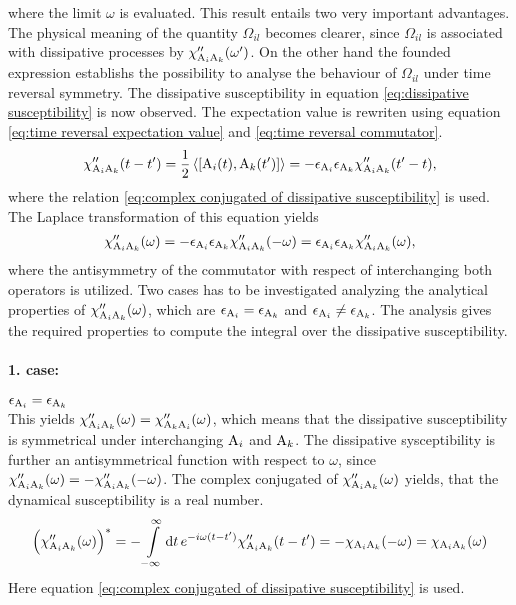 %
where the limit $\omega$ is evaluated.
This result entails two very important advantages.
The physical meaning of the quantity $\Omega_{il}$ becomes clearer, since $\Omega_{il}$ is associated with dissipative processes by $\chi''_{\mathrm{A}_{i} \mathrm{A}_{k}}(\omega')$.
On the other hand the founded expression establishs the possibility to analyse the behaviour of $\Omega_{il}$ under time reversal symmetry.
The dissipative susceptibility in equation \eqref{eq:dissipative susceptibility} is now observed.
The expectation value is rewriten using equation \eqref{eq:time reversal expectation value} and \eqref{eq:time reversal commutator}.
%
\begin{align}
	\chi''_{\mt{A}_{i} \mt{A}_{k}}(t-t') = \frac{1}{2} \expval{\comm{\mt{A}_{i}(t)}{\mt{A}_{k}(t')}}= -\epsilon_{\mt{A}_{i}} \epsilon_{\mt{A}_{k}} \chi''_{\mt{A}_{i} \mt{A}_{k}}(t'-t),
\end{align}
%
where the relation \eqref{eq:complex conjugated of dissipative susceptibility} is used.
The Laplace transformation of this equation yields
%
\begin{align}
	\chi''_{\mathrm{A}_{i} \mathrm{A}_{k}}(\omega) = -\epsilon_{\mathrm{A}_{i}} \epsilon_{\mathrm{A}_{k}} \chi''_{\mathrm{A}_{i} \mathrm{A}_{k}}(-\omega) = \epsilon_{\mathrm{A}_{i}} \epsilon_{\mathrm{A}_{k}} \chi''_{\mathrm{A}_{i} \mathrm{A}_{k}}(\omega),
\end{align}
%
where the antisymmetry of the commutator with respect of interchanging both operators is utilized.
Two cases has to be investigated analyzing the analytical properties of $\chi''_{\mathrm{A}_{i} \mathrm{A}_{k}}(\omega)$, which are $\epsilon_{\mathrm{A}_{i}} = \epsilon_{\mathrm{A}_{k}}$ and $\epsilon_{\mathrm{A}_{i}} \neq \epsilon_{\mathrm{A}_{k}}$.
The analysis gives the required properties to compute the integral over the dissipative susceptibility.
%
\paragraph{1. case:} $\epsilon_{\mathrm{A}_{i}} = \epsilon_{\mathrm{A}_{k}}$\\
%
This yields $\chi''_{\mathrm{A}_{i} \mathrm{A}_{k}}(\omega) = \chi''_{\mathrm{A}_{k} \mathrm{A}_{i}}(\omega)$, which means that the dissipative susceptibility is symmetrical under interchanging $\mathrm{A}_{i}$ and $\mathrm{A}_{k}$.
The dissipative sysceptibility is further an antisymmetrical function with respect to $\omega$, since $\chi''_{\mathrm{A}_{i} \mathrm{A}_{k}}(\omega) = -\chi''_{\mathrm{A}_{i} \mathrm{A}_{k}}(-\omega)$.
The complex conjugated of $\chi''_{\mathrm{A}_{i} \mathrm{A}_{k}}(\omega)$ yields, that the dynamical susceptibility is a real number.
%
\begin{align}
	\Big(\chi''_{\mathrm{A}_{i} \mathrm{A}_{k}}(\omega)\Big)^{*} = -\int\limits_{-\infty}^{\infty} \dd{t} e^{-i\omega(t-t')} \chi''_{\mathrm{A}_{i} \mathrm{A}_{k}}(t-t') = -\chi_{\mathrm{A}_{i} \mathrm{A}_{k}}(-\omega) = \chi_{\mathrm{A}_{i} \mathrm{A}_{k}}(\omega)
\end{align}
%
Here equation \eqref{eq:complex conjugated of dissipative susceptibility} is used.
%
